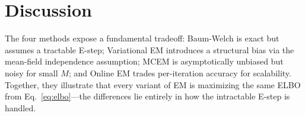 \documentclass{article}
\begin{document}
\section{Discussion}

The four methods expose a fundamental tradeoff: Baum-Welch is exact but
assumes a tractable E-step; Variational EM introduces a structural bias via
the mean-field independence assumption; MCEM is asymptotically unbiased but
noisy for small $M$; and Online EM trades per-iteration accuracy for
scalability. Together, they illustrate that every variant of EM is maximizing
the same ELBO from Eq.~\eqref{eq:elbo}---the differences lie entirely in how
the intractable E-step is handled.



\end{document}
